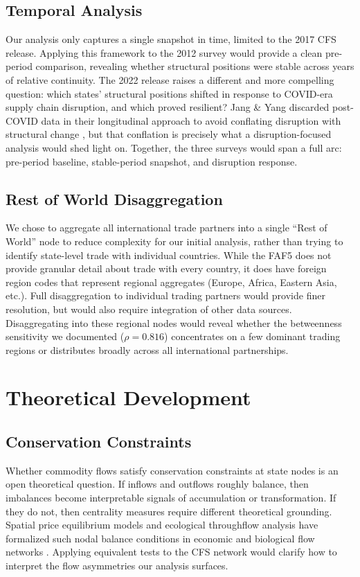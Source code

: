 \documentclass[12pt,oneside]{book}
\begin{document}
\subsection{Temporal Analysis}

Our analysis only captures a single snapshot in time, limited to the 2017 CFS release. Applying this framework to the 2012 survey would provide a clean pre-period comparison, revealing whether structural positions were stable across years of relative continuity. The 2022 release raises a different and more compelling question: which states' structural positions shifted in response to COVID-era supply chain disruption, and which proved resilient? Jang \& Yang discarded post-COVID data in their longitudinal approach to avoid conflating disruption with structural change \cite{jang_measuring_2023}, but that conflation is precisely what a disruption-focused analysis would shed light on. Together, the three surveys would span a full arc: pre-period baseline, stable-period snapshot, and disruption response. 

\subsection{Rest of World Disaggregation}
We chose to aggregate all international trade partners into a single ``Rest of World'' node to reduce complexity for our initial analysis, rather than trying to identify state-level trade with individual countries. While the FAF5 does not provide granular detail about trade with every country, it does have foreign region codes that represent regional aggregates (Europe, Africa, Eastern Asia, etc.). Full disaggregation to individual trading partners would provide finer resolution, but would also require integration of other data sources. Disaggregating into these regional nodes would reveal whether the betweenness sensitivity we documented ($\rho = 0.816$) concentrates on a few dominant trading regions or distributes broadly across all international partnerships. 



\section{Theoretical Development}
\subsection{Conservation Constraints}

Whether commodity flows satisfy conservation constraints at state nodes is an open theoretical question. If inflows and outflows roughly balance, then imbalances become interpretable signals of accumulation or transformation. If they do not, then centrality measures require different theoretical grounding. Spatial price equilibrium models and ecological throughflow analysis have formalized such nodal balance conditions in economic and biological flow networks \cite{takayama_spatial_1971, hannon_structure_1973}. Applying equivalent tests to the CFS network would clarify how to interpret the flow asymmetries our analysis surfaces. 
\end{document}
